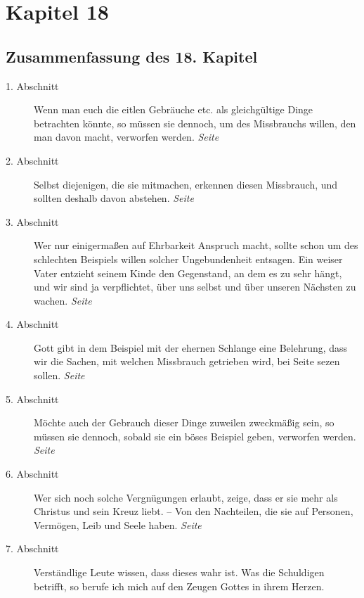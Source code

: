 
\chapter{Kapitel 18} \label{kap18}
\section{Zusammenfassung des 18. Kapitel}

\begin{description}
\item[1. Abschnitt] Wenn man euch die eitlen Gebräuche etc. als gleichgültige
Dinge betrachten könnte, so müssen sie dennoch, um des Missbrauchs willen, den
man davon macht, verworfen werden.
\dotfill \textit{Seite~\pageref{kap18_ab1}}\\
\item[2. Abschnitt] Selbst diejenigen, die sie mitmachen, erkennen diesen
Missbrauch, und sollten deshalb davon abstehen.
\dotfill \textit{Seite~\pageref{kap18_ab2}}\\
\item[3. Abschnitt] Wer nur einigermaßen auf Ehrbarkeit Anspruch macht, sollte
schon um des schlechten Beispiels willen solcher Ungebundenheit entsagen. Ein
weiser Vater entzieht seinem Kinde den Gegenstand, an dem es zu sehr hängt, und
wir sind ja verpflichtet, über uns selbst und über unseren Nächsten zu wachen.
\dotfill \textit{Seite~\pageref{kap18_ab3}}\\
\item[4. Abschnitt] Gott gibt in dem Beispiel mit der ehernen Schlange eine
Belehrung, dass wir die Sachen, mit welchen Missbrauch getrieben wird, bei
Seite sezen sollen.
\dotfill \textit{Seite~\pageref{kap18_ab4}}\\
\item[5. Abschnitt] Möchte auch der Gebrauch dieser Dinge zuweilen zweckmäßig
sein, so müssen sie dennoch, sobald sie ein böses Beispiel geben, verworfen
werden.
\dotfill \textit{Seite~\pageref{kap18_ab5}}\\
\item[6. Abschnitt] Wer sich noch solche Vergnügungen erlaubt, zeige, dass er
sie
mehr als Christus und sein Kreuz liebt. -- Von den Nachteilen, die sie auf
Personen, Vermögen, Leib und Seele haben.
\dotfill \textit{Seite~\pageref{kap18_ab6}}\\
\item[7. Abschnitt] Verständlige Leute wissen, dass dieses wahr ist. Was die
Schuldigen betrifft, so berufe ich mich auf den Zeugen Gottes in ihrem Herzen.

\end{description}
